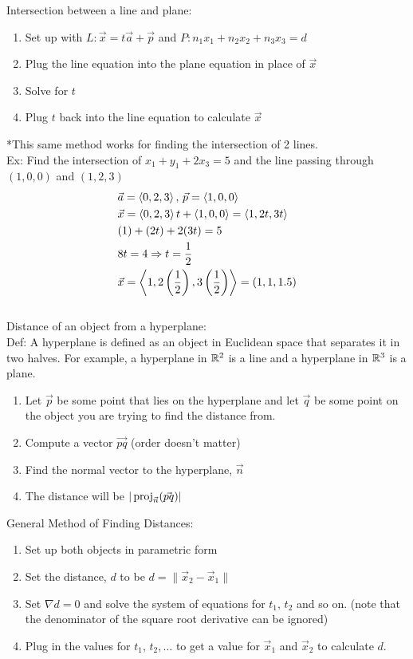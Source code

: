 \documentclass[11pt, fleqn]{article}
\begin{document}
Intersection between a line and plane:
\begin{enumerate}
    \item Set up with $L:\vec{x}=t\vec{a}+\vec{p}$ and $P:n_1x_1+n_2x_2+n_3x_3=d$
    \item Plug the line equation into the plane equation in place of $\vec{x}$
    \item Solve for $t$
    \item Plug $t$ back into the line equation to calculate $\vec{x}$
\end{enumerate}
*This same method works for finding the intersection of 2 lines.\\
Ex: Find the intersection of $x_1+y_1+2x_3=5$ and the line passing through $(1,0,0)$ and $(1,2,3)$
\begin{align*}
    &\vec{a}=\left\langle 0,2,3 \right\rangle,\,\vec{p}=\left\langle 1,0,0 \right\rangle\\
    &\vec{x}=\left\langle 0,2,3 \right\rangle t+\left\langle 1,0,0 \right\rangle=\left\langle 1,2t,3t \right\rangle\\
    &(1)+(2t)+2(3t)=5\\
    &8t=4\Rightarrow t=\frac{1}{2}\\
    &\vec{x}=\left\langle 1,2\left( \frac{1}{2} \right),3\left( \frac{1}{2} \right) \right\rangle=(1,1,1.5)
\end{align*}
\\
Distance of an object from a hyperplane:\\
Def: A hyperplane is defined as an object in Euclidean space that separates it in two halves. For example, a hyperplane in $\mathbb{R}^2$ is a line and a hyperplane in $\mathbb{R}^3$ is a plane.\\
\begin{enumerate}
    \item Let $\vec{p}$ be some point that lies on the hyperplane and let $\vec{q}$ be some point on the object you are trying to find the distance from.
    \item Compute a vector $\vec{pq}$ (order doesn't matter)
    \item Find the normal vector to the hyperplane, $\vec{n}$
    \item The distance will be $|\operatorname{proj}_{\vec{n}}(\vec{pq})|$
\end{enumerate}
General Method of Finding Distances:
\begin{enumerate}
    \item Set up both objects in parametric form
    \item Set the distance, $d$ to be $d=\|\vec{x}_2-\vec{x}_1\|$
    \item Set $\nabla d=0$ and solve the system of equations for $t_1,\,t_2$ and so on. (note that the denominator of the square root derivative can be ignored)
    \item Plug in the values for $t_1,\,t_2,\ldots$ to get a value for $\vec{x}_1$ and $\vec{x}_2$ to calculate $d$.
\end{enumerate}
\end{document}

